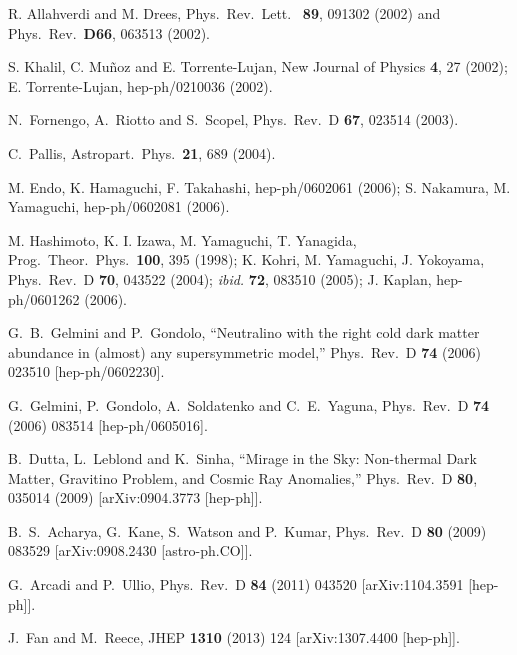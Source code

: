 \documentclass[11pt,a4paper]{article}
\begin{document}
\begin{thebibliography}{9}
R. Allahverdi and M. Drees, Phys.\ Rev.\ Lett.\ {\bf
89}, 091302 (2002) and Phys.\ Rev.\ {\bf D66}, 063513 (2002).
 
S. Khalil, C. Mu\~noz and E. Torrente-Lujan, New
Journal of Physics {\bf 4}, 27 (2002); E. Torrente-Lujan, hep-ph/0210036 (2002).

  N.~Fornengo, A.~Riotto and S.~Scopel,
  Phys.\ Rev.\ D {\bf 67}, 023514 (2003).


  
  C.~Pallis, Astropart.\ Phys.\  {\bf 21}, 689 (2004).
  
  M. Endo, K. Hamaguchi, F. Takahashi, hep-ph/0602061 (2006); S. Nakamura, M. Yamaguchi, hep-ph/0602081 (2006).

M. Hashimoto, K. I. Izawa, M. Yamaguchi, T. Yanagida, Prog.\ Theor.\ Phys.\ {\bf 100}, 395 (1998); K. Kohri, M. Yamaguchi, J. Yokoyama, Phys.\ Rev.\ D {\bf 70}, 043522 (2004); {\it ibid.} {\bf 72}, 083510 (2005); J. Kaplan, hep-ph/0601262 (2006).
 
 
  G.~B.~Gelmini and P.~Gondolo,
  ``Neutralino with the right cold dark matter abundance in (almost) any supersymmetric model,''
  Phys.\ Rev.\ D {\bf 74} (2006) 023510
  [hep-ph/0602230].
  
  G.~Gelmini, P.~Gondolo, A.~Soldatenko and C.~E.~Yaguna,
  Phys.\ Rev.\ D {\bf 74} (2006) 083514
  [hep-ph/0605016].
  
 
  B.~Dutta, L.~Leblond and K.~Sinha,
  ``Mirage in the Sky: Non-thermal Dark Matter, Gravitino Problem, and Cosmic Ray Anomalies,''
  Phys.\ Rev.\ D {\bf 80}, 035014 (2009)
  [arXiv:0904.3773 [hep-ph]].

  B.~S.~Acharya, G.~Kane, S.~Watson and P.~Kumar,
  Phys.\ Rev.\ D {\bf 80} (2009) 083529
  [arXiv:0908.2430 [astro-ph.CO]].
  
  G.~Arcadi and P.~Ullio,
  Phys.\ Rev.\ D {\bf 84} (2011) 043520
  [arXiv:1104.3591 [hep-ph]].
  
  J.~Fan and M.~Reece,
  JHEP {\bf 1310} (2013) 124
  [arXiv:1307.4400 [hep-ph]].
  

\end{thebibliography}
\end{document}
